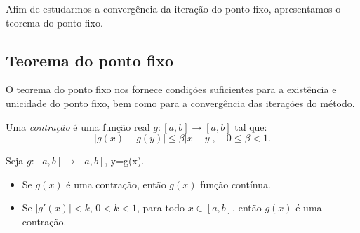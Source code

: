 Afim de estudarmos a convergência da iteração do ponto fixo, apresentamos o teorema do ponto fixo.

\subsection{Teorema do ponto fixo}

O teorema do ponto fixo nos fornece condições suficientes para a existência e unicidade do ponto fixo, bem como para a convergência das iterações do método.

\begin{defn}
 Uma \emph{contração} é uma função real $g:[a, b]\to [a, b]$ tal que:
 \begin{equation*}
   |g(x)-g(y)|\leq \beta |x-y|,\quad 0\leq \beta < 1.
 \end{equation*}
\end{defn}

\begin{obs}Seja $g:[a, b]\to [a, b]$, y=g(x).
  \begin{itemize}
  \item Se $g(x)$ é uma contração, então $g(x)$ função contínua.
  \item Se $|g'(x)| < k$, $0 < k < 1$, para todo $x\in [a, b]$, então $g(x)$ é uma contração.
  \end{itemize}
\end{obs}

